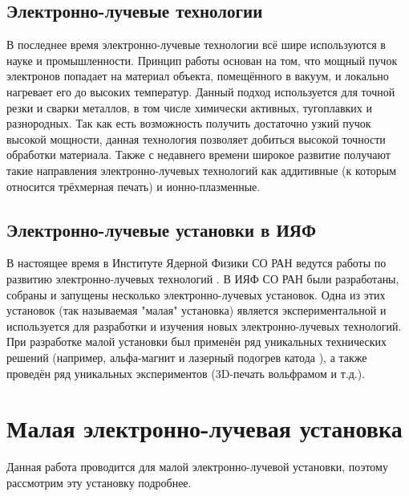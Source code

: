 \documentclass[14pt,russian,a4paper]{extarticle}
\begin{document}
\subsection{Электронно-лучевые технологии}
В последнее время электронно-лучевые технологии всё шире используются в науке и промышленности. Принцип работы основан на том, что мощный пучок электронов попадает на материал объекта, помещённого в вакуум, и локально нагревает его до высоких температур. Данный подход используется для точной резки и сварки металлов, в том числе химически активных, тугоплавких и разнородных. Так как есть возможность получить достаточно узкий пучок высокой мощности, данная технология позволяет добиться высокой точности обработки материала. Также с недавнего времени широкое развитие получают такие направления электронно-лучевых технологий как аддитивные (к которым относится трёхмерная печать) и ионно-плазменные.

\subsection{Электронно-лучевые установки в ИЯФ}
В настоящее время в Институте Ядерной Физики СО РАН ведутся работы по развитию электронно-лучевых технологий \cite{weld_coord}. В ИЯФ СО РАН были разработаны, собраны и запущены несколько электронно-лучевых установок. Одна из этих установок (так называемая "малая" установка) является экспериментальной и используется для разработки и изучения новых электронно-лучевых технологий. При разработке малой установки был применён ряд уникальных технических решений (например, альфа-магнит \cite{alpha_magnet} и лазерный подогрев катода \cite{laser_heat}), а также проведён ряд уникальных экспериментов (3D-печать вольфрамом \cite{wolfram_3d} и т.д.).

\section{Малая электронно-лучевая установка}
Данная работа проводится для малой электронно-лучевой установки, поэтому рассмотрим эту установку подробнее.
\end{document}
